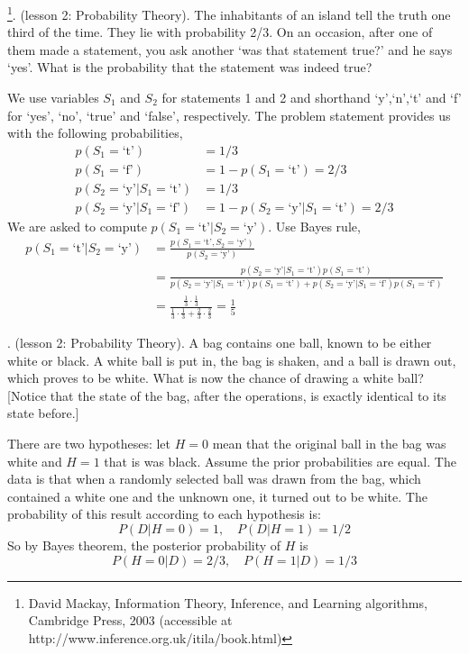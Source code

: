 \documentclass[a4paper]{article}
\begin{document}
\begin{ExerciseList}

\Exercise[label={ex:inhabitants},origin={DM03, ex.2.36}]\footnote{David Mackay, Information Theory, Inference, and Learning algorithms, Cambridge Press, 2003 (accessible at http://www.inference.org.uk/itila/book.html)}. (lesson 2: Probability Theory). The inhabitants of an island tell the
 truth one third of the time. They lie with  probability  2/3.
 On an occasion, after one of them made a statement,
 you ask another `was that statement true?'
 and he says `yes'. What is the probability that the statement was indeed true?

\Answer[ref={ex:inhabitants}] We use variables $S_1$ and $S_2$ for statements 1 and 2 and shorthand `y',`n',`t' and `f' for `yes', `no', `true' and `false', respectively. The problem statement provides us with the following probabilities,
\begin{align*}
p(S_1=\text{`t'})&= 1/3\\
p(S_1=\text{`f'})&= 1 - p(S_1=\text{`t'})= 2/3\\
p(S_2=\text{`y'}|S_1=\text{`t'})&= 1/3 \\
p(S_2=\text{`y'}|S_1=\text{`f'})&= 1-p(S_2=\text{`y'}|S_1=\text{`t'})= 2/3
\end{align*}
We are asked to compute $p(S_1=\text{`t'}|S_2=\text{`y'})$. Use Bayes rule,
\begin{align*}
p(S_1=\text{`t'}|S_2=\text{`y'}) &= \frac{p(S_1=\text{`t'},S_2=\text{`y'})}{p(S_2=\text{`y'})}\\
&=\frac{p(S_2=\text{`y'}|S_1=\text{`t'})p(S_1=\text{`t'})}{p(S_2=\text{`y'}|S_1=\text{`t'})p(S_1=\text{`t'})+p(S_2=\text{`y'}|S_1=\text{`f'})p(S_1=\text{`f'})}\\
&= \frac{\frac{1}{3}\cdot\frac{1}{3}}{\frac{1}{3}\cdot\frac{1}{3}+\frac{2}{3}\cdot\frac{2}{3}} = \frac{1}{5}
\end{align*}

\Exercise[label={ex:bagcounter},origin={DM03, ex.3.12}]. (lesson 2: Probability Theory).  A bag contains one ball, known to be
 either white or black. A white ball is put in, the bag is shaken,
 and a ball is drawn out, which proves to be white. What is now the
 chance of drawing a white ball? [Notice that
 the state of the bag, after the operations, is exactly identical to its state before.]

\Answer[ref={ex:bagcounter}] There are two hypotheses: let $H = 0$ mean
that the original ball in the bag was white and $H = 1$ that is was black.
Assume the prior probabilities are equal. The data is that when a randomly
selected ball was drawn from the bag, which contained a white one and
the unknown one, it turned out to be white. The probability of this result
according to each hypothesis is:
$$ P(D|H =0) = 1,\quad P(D|H =1) = 1/2$$
So by Bayes theorem, the posterior probability of $H$ is
$$P(H =0|D) = 2/3,\quad P(H =1|D) = 1/3$$


\end{ExerciseList}
\end{document}
